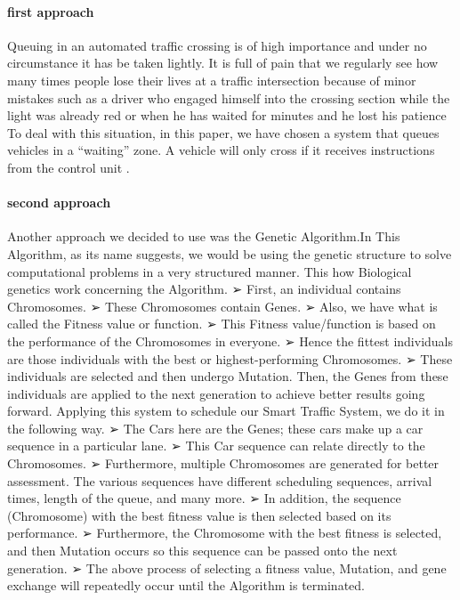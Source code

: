 \documentclass[conference]{IEEEtran}
\begin{document}
\paragraph{first approach}Queuing in an automated traffic crossing is of high importance and under no circumstance it has be taken lightly. It is full of pain that we regularly see how many times people lose their lives at a traffic intersection because of minor mistakes such as a  driver who engaged himself into the crossing section while the light was already red or when he has waited for minutes and he lost his patience \newline
To deal with this situation, in this paper, we have chosen a system that queues vehicles in a “waiting” zone. A vehicle will only cross if it receives instructions from the control unit \hfill.

\paragraph{second approach}Another approach we decided to use was the Genetic Algorithm.In This Algorithm, as its name suggests, we would be using the genetic structure to solve computational problems in a very structured manner. This how Biological genetics work concerning the Algorithm.
➢ First, an individual contains Chromosomes.
➢ These Chromosomes contain Genes.
➢ Also, we have what is called the Fitness value or function.
➢ This Fitness value/function is based on the performance of the Chromosomes in everyone.  
➢ Hence the fittest individuals are those individuals with the best or highest-performing Chromosomes.  
➢ These individuals are selected and then undergo Mutation. Then, the Genes from these individuals are applied to the next generation to achieve better results going forward.
Applying this system to schedule our Smart Traffic System, we do it in the following way.  
➢ The Cars here are the Genes; these cars make up a car sequence in a particular lane.  
➢ This Car sequence can relate directly to the Chromosomes.
➢ Furthermore, multiple Chromosomes are generated for better assessment. The various sequences have different scheduling sequences, arrival times, length of the queue, and many more.   
➢ In addition, the sequence (Chromosome) with the best fitness value is then selected based on its performance.
➢ Furthermore, the Chromosome with the best fitness is selected, and then Mutation occurs so this sequence can be passed onto the next generation.
➢ The above process of selecting a fitness value, Mutation, and gene exchange will repeatedly occur until the Algorithm is terminated.
\end{document}
